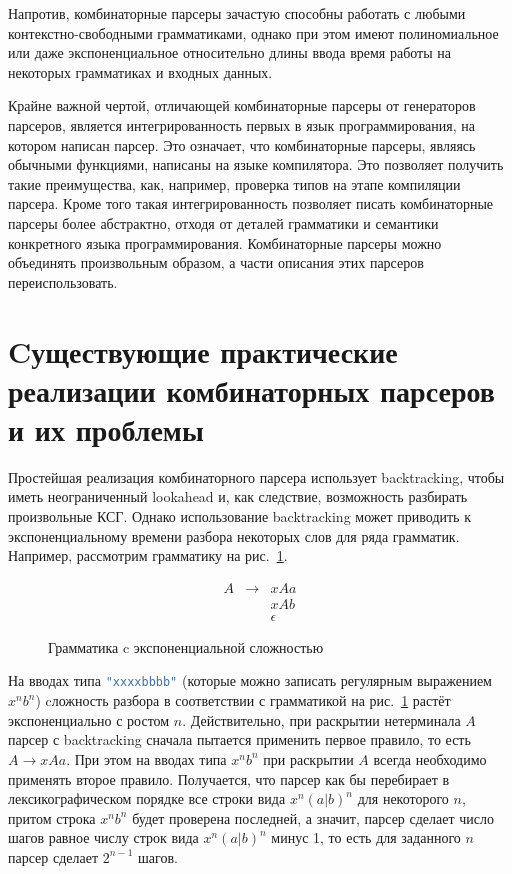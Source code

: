 \documentclass[times]{itmo-student-thesis}
\begin{document}
Напротив, комбинаторные парсеры зачастую способны работать с любыми контекстно-свободными грамматиками, однако при этом
имеют полиномиальное или даже экспоненциальное относительно длины ввода время работы на некоторых грамматиках и входных
данных.

Крайне важной чертой, отличающей  комбинаторные парсеры от генераторов парсеров, является интегрированность первых в
язык программирования, на котором написан парсер. Это означает, что комбинаторные парсеры, являясь обычными функциями,
написаны на языке компилятора. Это позволяет получить такие преимущества, как, например, проверка типов на этапе
компиляции парсера. Кроме того такая интегрированность позволяет писать комбинаторные парсеры более абстрактно, отходя
от деталей грамматики и семантики конкретного языка программирования. Комбинаторные парсеры можно объединять
произвольным образом, а части описания этих парсеров переиспользовать.

\section{Cуществующие практические реализации комбинаторных парсеров и их проблемы}\label{sec:current_parser_combinators_problems}

Простейшая реализация комбинаторного парсера использует backtracking, чтобы иметь неограниченный lookahead и, как
следствие, возможность разбирать произвольные КСГ. Однако использование backtracking может приводить к
экспоненциальному времени разбора некоторых слов для ряда грамматик. Например, рассмотрим грамматику на
рис.~\ref{exp_grammar}.

\begin{figure}[!h]
\caption{Грамматика c экспоненциальной сложностью}\label{exp_grammar}
\[
    \begin{array}{lll}
        A & \to & xAa      \\
          &     & xAb      \\
          &     & \epsilon
    \end{array}
\]
\end{figure}

На вводах типа \lstinline[language=Haskell]{"xxxxbbbb"} (которые можно записать регулярным выражением $x^nb^n$) cложность разбора
в соответствии с грамматикой на рис.~\ref{exp_grammar} растёт экспоненциально с ростом $n$.
Действительно, при раскрытии нетерминала $A$ парсер с backtracking сначала пытается применить первое
правило, то есть $A \to xAa$. При этом на вводах типа $x^nb^n$ при раскрытии
$A$ всегда необходимо применять второе правило. Получается, что парсер как бы перебирает в
лексикографическом порядке все строки вида $x^n(a|b)^n$ для некоторого $n$, притом строка
$x^nb^n$ будет проверена последней, а значит, парсер сделает число шагов равное числу строк вида
$x^n(a|b)^n$ минус 1, то есть для заданного $n$ парсер сделает $2^{n-1}$ шагов.
\end{document}
